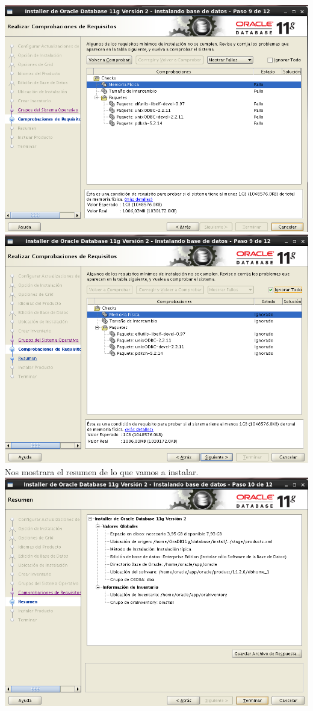 \documentclass[12pt,letterpaper]{article}
\begin{document}
\begin{center}
\includegraphics[width=15cm]{./oraclelinux/21.png}\\
\includegraphics[width=15cm]{./oraclelinux/22.png}\\
Nos mostrara el resumen de lo que vamos a instalar.\\
\includegraphics[width=15cm]{./oraclelinux/23.png}\\

\end{center}
\end{document}
